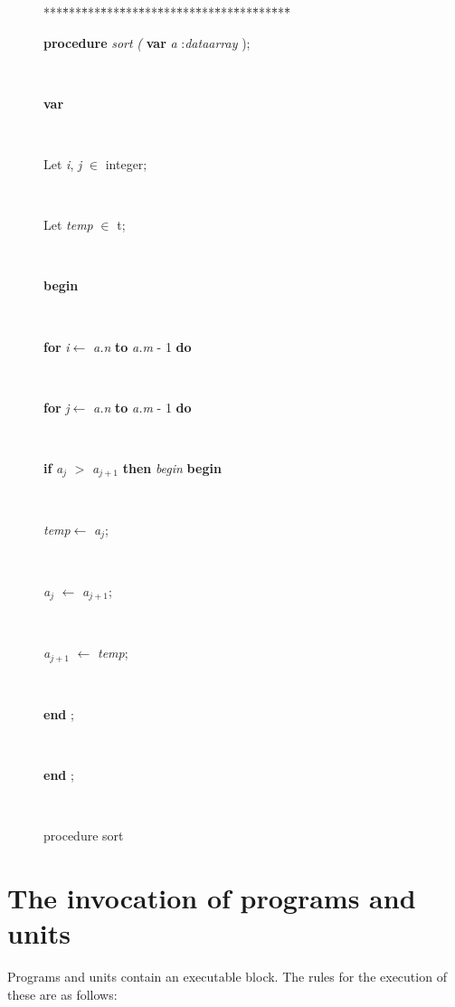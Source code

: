 {\begin{figure}
\begin{tabbing}
***\=***\=***\=***\=***\=***\=***\=***\=***\=***\=***\=***\=***\=\kill
\parbox{14cm}{\textsf {\textbf {procedure } \textsf{ \textit{sort} \textit{(} } \textbf{ var } \textsf{ \textit{a} :\textit{dataarray} );}}}\\
\+\parbox{14cm}{\textsf{\textbf{var} }}\\
\parbox{14cm}{\textsf{Let \textit{i}, \textit{j} $\in$ integer;}}\\
\parbox{14cm}{\textsf{Let \textit{temp} $\in$ t;}}\\
\-\<\+\parbox{14cm}{\textsf{\textbf{begin} }}\\
\+\parbox{14cm}{\textsf {\textbf {for } \textsf{\textit{i}$\leftarrow$ \textit{a.n}} \textbf{ to } \textsf{\textit{a.m} - 1} \textbf{ do } }}\\
\+\parbox{14cm}{\textsf {\textbf {for } \textsf{\textit{j}$\leftarrow$ \textit{a.n}} \textbf{ to } \textsf{\textit{a.m} - 1} \textbf{ do } }}\\
\+\<\parbox{14cm}{\textsf {\textbf {if } \textsf{\textit{a}$_{\textit{j}}$ $>$ \textit{a}$_{\textit{j} + 1}$} \textbf{ then } \textsf{\textit{begin}} \textbf{ begin } }}\\
\parbox{14cm}{\textsf{\textit{temp}$\leftarrow$ \textit{a}$_{\textit{j}}$}; }\\
\parbox{14cm}{\textsf{\textit{a}$_{\textit{j}}$ $\leftarrow$ \textit{a}$_{\textit{j} + 1}$}; }\\
\parbox{14cm}{\textsf{\textit{a}$_{\textit{j} + 1}$ $\leftarrow$ \textit{temp}}; }\\
\<\-\parbox{14cm}{\textsf{\textbf{end} ;}}\\
\<\-\<\-\<\-\parbox{14cm}{\textsf{\textbf{end} ;}}\\
\end{tabbing}


\caption{procedure sort}\label{sec:./genericsortsort}

\end{figure}

\section{The invocation of programs and units}

Programs and units contain an executable block. The rules for
the execution of these are as follows:

}
